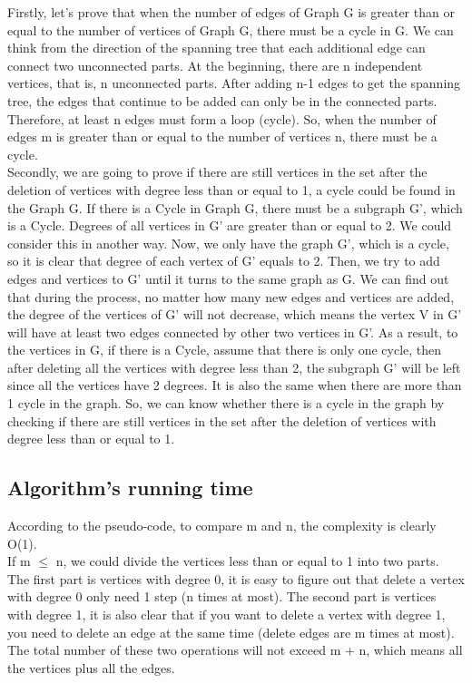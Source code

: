\documentclass[]{article}
\begin{document}
	\noindent Firstly, let's prove that when the number of edges of Graph G is greater than or equal to the number of vertices of Graph G, there must be a cycle in G. We can think from the direction of the spanning tree that each additional edge can connect two unconnected parts. At the beginning, there are n independent vertices, that is, n unconnected parts. After adding n-1 edges to get the spanning tree, the edges that continue to be added can only be in the connected parts. Therefore, at least n edges must form a loop (cycle). So, when the number of edges m is greater than or equal to the number of vertices n, there must be a cycle.  \\
	
	\noindent Secondly, we are going to prove if there are still vertices in the set after the deletion of vertices with degree less than or equal to 1, a cycle could be found in the Graph G. If there is a Cycle in Graph G, there must be a subgraph G', which is a Cycle. Degrees of all vertices in G' are greater than or equal to 2. We could consider this in another way. Now, we only have the graph G', which is a cycle, so it is clear that degree of each vertex of G' equals to 2. Then, we try to add edges and vertices to G' until it turns to the same graph as G. We can find out that during the process, no matter how many new edges and vertices are added, the degree of the vertices of G' will not decrease, which means the vertex V in G' will have at least two edges connected by other two vertices in G'. As a result, to the vertices in G, if there is a Cycle, assume that there is only one cycle, then after deleting all the vertices with degree less than 2, the subgraph G' will be left since all the vertices have 2 degrees. It is also the same when there are more than 1 cycle in the graph. So, we can know whether there is a cycle in the graph by checking if there are still vertices in the set after the deletion of vertices with degree less than or equal to 1.  \\
	
	\subsection{Algorithm's running time}
	
	According to the pseudo-code, to compare m and n, the complexity is clearly O(1).\\
	
	\noindent If m $\le$ n, we could divide the vertices less than or equal to 1 into two parts. The first part is vertices with degree 0, it is easy to figure out that delete a vertex with degree 0 only need 1 step (n times at most). The second part is vertices with degree 1, it is also clear that if you want to delete a vertex with degree 1, you need to delete an edge at the same time (delete edges are m times at most). The total number of these two operations will not exceed m + n, which means all the vertices plus all the edges. \\
	
\end{document}
